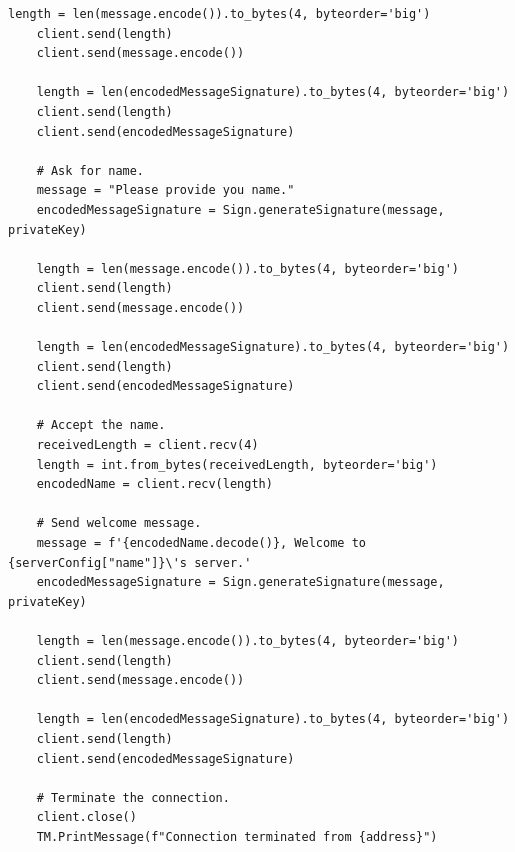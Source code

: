 \begin{lstlisting}[style=mypython, caption={server.py}, label={code:A-2-b-server}]
    length = len(message.encode()).to_bytes(4, byteorder='big')
    client.send(length)
    client.send(message.encode())

    length = len(encodedMessageSignature).to_bytes(4, byteorder='big')
    client.send(length)
    client.send(encodedMessageSignature)

    # Ask for name.
    message = "Please provide you name."
    encodedMessageSignature = Sign.generateSignature(message, privateKey)

    length = len(message.encode()).to_bytes(4, byteorder='big')
    client.send(length)
    client.send(message.encode())

    length = len(encodedMessageSignature).to_bytes(4, byteorder='big')
    client.send(length)
    client.send(encodedMessageSignature)

    # Accept the name.
    receivedLength = client.recv(4)
    length = int.from_bytes(receivedLength, byteorder='big')
    encodedName = client.recv(length)

    # Send welcome message.
    message = f'{encodedName.decode()}, Welcome to {serverConfig["name"]}\'s server.'
    encodedMessageSignature = Sign.generateSignature(message, privateKey)

    length = len(message.encode()).to_bytes(4, byteorder='big')
    client.send(length)
    client.send(message.encode())

    length = len(encodedMessageSignature).to_bytes(4, byteorder='big')
    client.send(length)
    client.send(encodedMessageSignature)

    # Terminate the connection.
    client.close()
    TM.PrintMessage(f"Connection terminated from {address}")
\end{lstlisting}

